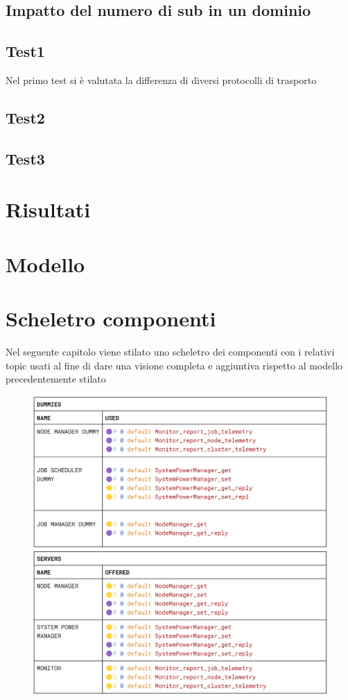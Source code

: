 \subsection{Impatto del numero di sub in un dominio}

\subsection{Test1}
Nel primo test si è valutata la differenza di diversi protocolli di trasporto 
\subsection{Test2}
\subsection{Test3}

\section{Risultati}
\section{Modello}
\section{Scheletro componenti}
Nel seguente capitolo viene stilato uno scheletro dei componenti con i relativi topic usati al fine di dare una visione completa e aggiuntiva rispetto al modello precedentemente stilato  
\begin{figure}[H]
    \centering
    \includegraphics[width=\textwidth]{./img/dummies_skeleton.png}
    \includegraphics[width=\textwidth]{./img/server_skeleton.png}
\end{figure}
